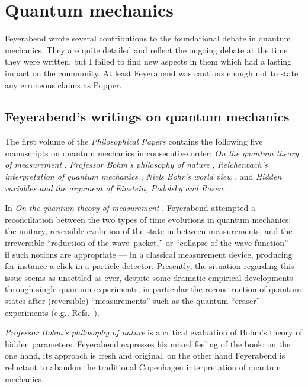 \documentclass{article}
\begin{document}
\section{Quantum mechanics}

Feyerabend wrote several contributions to the foundational debate
in quantum mechanics.
They are quite detailed and reflect the ongoing debate at the time they were written,
but I failed to find new aspects in them which had a lasting impact on the community.
At least Feyerabend was cautious enough not to state any erroneous claims as Popper.


\subsection{Feyerabend's writings on quantum mechanics}


The first volume of the {\em Philosophical Papers} \cite{fey-philpapers1}
contains the following five manuscripts on quantum mechanics in consecutive order:
{\em On the quantum theory of measurement} \cite{fey-papers1-measure},
{\em Professor {B}ohm's philosophy of nature} \cite{fey-papers1-bohm},
{\em {R}eichenbach's interpretation of quantum mechanics} \cite{fey-papers1-Reichen},
{\em {N}iels {B}ohr's world view} \cite{fey-papers1-Bohr},
and
{\em Hidden variables and the argument of {E}instein, {P}odolsky and {R}osen} \cite{fey-papers1-EPR}.


In {\em On the quantum theory of measurement} \cite{fey-papers1-measure},
Feyerabend attempted a reconciliation between the two types of time evolutions
in quantum mechanics:
the unitary, reversible evolution of the state
in-between measurements,
and the irreversible ``reduction of the wave--packet,''
or ``collapse of the wave function'' --- if such notions are appropriate ---
in a classical measurement device, producing for instance a click in a particle detector.
Presently, the situation regarding this issue seems as unsettled as ever,
despite some dramatic empirical developments through single quantum experiments;
in particular the reconstruction of quantum states after (reversible) ``measurements'' such as
the quantum ``eraser'' experiments (e.g., Refs.~\cite{hkwz,greenberger2}).

{\em Professor {B}ohm's philosophy of nature} \cite{fey-papers1-bohm}
is a critical evaluation of Bohm's theory of hidden parameters.
Feyerabend expresses his mixed feeling of the book: on the one hand,
its approach is fresh and original, on the other hand Feyerabend is reluctant to
abandon the traditional Copenhagen interpretation of quantum mechanics.
\end{document}
